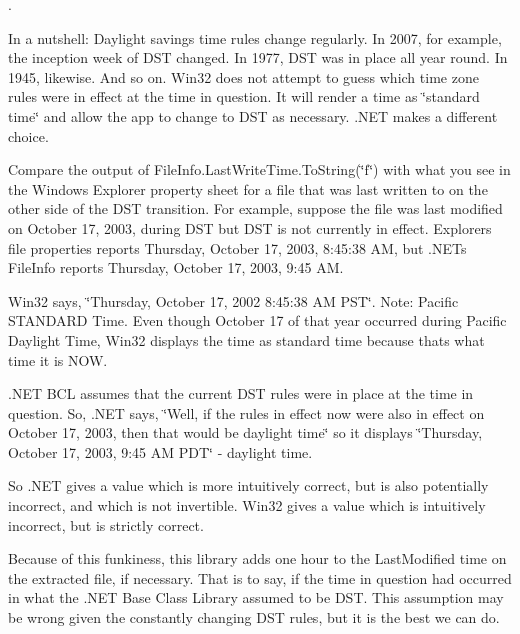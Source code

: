 . 

In a nutshell\+: Daylight savings time rules change regularly. In 2007, for example, the inception week of D\+ST changed. In 1977, D\+ST was in place all year round. In 1945, likewise. And so on. Win32 does not attempt to guess which time zone rules were in effect at the time in question. It will render a time as \char`\"{}standard time\char`\"{} and allow the app to change to D\+ST as necessary. .N\+ET makes a different choice. 

Compare the output of File\+Info.\+Last\+Write\+Time.\+To\+String(\char`\"{}f\char`\"{}) with what you see in the Windows Explorer property sheet for a file that was last written to on the other side of the D\+ST transition. For example, suppose the file was last modified on October 17, 2003, during D\+ST but D\+ST is not currently in effect. Explorer\textquotesingle{}s file properties reports Thursday, October 17, 2003, 8\+:45\+:38 AM, but .N\+E\+Ts File\+Info reports Thursday, October 17, 2003, 9\+:45 AM. 

Win32 says, \char`\"{}\+Thursday, October 17, 2002 8\+:45\+:38 A\+M P\+S\+T\char`\"{}. Note\+: Pacific S\+T\+A\+N\+D\+A\+RD Time. Even though October 17 of that year occurred during Pacific Daylight Time, Win32 displays the time as standard time because that\textquotesingle{}s what time it is N\+OW. 

.N\+ET B\+CL assumes that the current D\+ST rules were in place at the time in question. So, .N\+ET says, \char`\"{}\+Well, if the rules in effect now were also in
  effect on October 17, 2003, then that would be daylight time\char`\"{} so it displays \char`\"{}\+Thursday, October 17, 2003, 9\+:45 A\+M P\+D\+T\char`\"{} -\/ daylight time. 

So .N\+ET gives a value which is more intuitively correct, but is also potentially incorrect, and which is not invertible. Win32 gives a value which is intuitively incorrect, but is strictly correct. 

Because of this funkiness, this library adds one hour to the Last\+Modified time on the extracted file, if necessary. That is to say, if the time in question had occurred in what the .N\+ET Base Class Library assumed to be D\+ST. This assumption may be wrong given the constantly changing D\+ST rules, but it is the best we can do. \mbox{\label{class_super_tiled2_unity_1_1_ionic_1_1_zip_1_1_zip_entry_a88021d72ea8b94c762388d92d74c2e0d}} 
